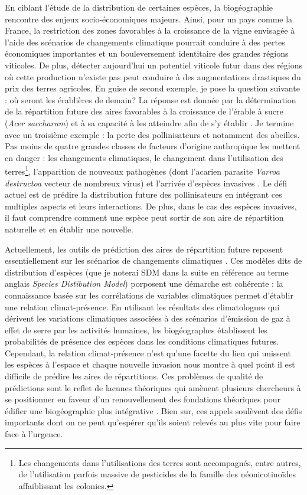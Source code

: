 En ciblant l'étude de la distribution de certaines espèces, la
biogéographie rencontre des enjeux socio-économiques majeurs. Ainsi,
pour un pays comme la France, la restriction des zones favorables à la
croissance de la vigne envisagée à l'aide des scénarios de changements
climatique \citep{Hannah2013} pourrait conduire à des pertes économiques
importantes et un bouleversement identitaire des grandes régions
viticoles. De plus, détecter aujourd'hui un potentiel viticole futur
dans des régions où cette production n'existe pas peut conduire à des
augmentations drastiques du prix des terres agricoles. En guise de
second exemple, je pose la question suivante : où seront les érablières
de demain? La réponse est donnée par la détermination de la répartition
future des aires favorables à la croissance de l'érable à sucre
(\emph{Acer saccharum}) et à sa capacité à les atteindre afin de s'y
établir \citep{Solarik2016}. Je termine avec un troisième exemple : la
perte des pollinisateurs et notamment des abeilles. Pas moins de quatre
grandes classes de facteurs d'origine anthropique les mettent en danger
: les changements climatiques, le changement dans l'utilisation des
terres\footnote{Les changements dans l'utilisations des terres sont
  accompagnés, entre autres, de l'utilisation parfois massive de
  pesticides de la famille des néonicotinoïdes affaiblissant les
  colonies.}, l'apparition de nouveaux pathogènes (dont l'acarien
parasite \emph{Varroa destructoa} vecteur de nombreux virus) et
l'arrivée d'espèces invasives \citep[comme le frelon
asiatique][]{Vanbergen2013}. Le défi actuel est de prédire la
distribution future des pollinisateurs en intégrant ces multiples
aspects et leurs interactions. De plus, dans le cas des espèces
invasives, il faut comprendre comment une espèce peut sortir de son aire
de répartition naturelle et en établir une nouvelle.

Actuellement, les outils de prédiction des aires de répartition future
reposent essentiellement sur les scénarios de changements climatiques
\citep{Peterson2011}. Ces modèles dits de distribution d'espèces (que je
noterai SDM dans la suite en référence au terme anglais \emph{Species
Distibution Model}) porposent une démarche est cohérente : la
connaissance basée sur les corrélations de variables climatiques permet
d'établir une relation climat-présence. En utilisant les résultats des
climatologues qui dérivent les variations climatiques associées à des
scénarios d'émission de gaz à effet de serre par les activités humaines,
les biogéographes établissent les probabilités de présence des espèces
dans les conditions climatiques futures. Cependant, la relation
climat-présence n'est qu'une facette du lien qui unissent les espèces à
l'espace et chaque nouvelle invasion nous montre à quel point il est
difficile de prédire les aires de répartitions. Ces problèmes de qualité
de prédictions sont le reflet de lacunes théoriques qui amènent
plusieurs chercheurs à se positionner en faveur d'un renouvellement des
fondations théoriques pour édifier une biogéographie plus intégrative
\citep{Lomolino2000, Beck2012, Thuiller2013}. Bien sur, ces appels
soulèvent des défis importants dont on ne peut qu'espérer qu'ils soient
relevés au plus vite pour faire face à l'urgence.

